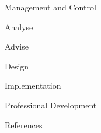 \documentclass{matthijs}
\begin{document}
	\begin{hoofdstuk}{Management and Control}

	\end{hoofdstuk}
	
	\begin{hoofdstuk}{Analyse}

	\end{hoofdstuk}
	
	\begin{hoofdstuk}{Advise}

	\end{hoofdstuk}
	
	\begin{hoofdstuk}{Design}

	\end{hoofdstuk}
	
	\begin{hoofdstuk}{Implementation}

	\end{hoofdstuk}
	
	\begin{hoofdstuk}{Professional Development}

	\end{hoofdstuk}

	\begin{hoofdstuk}{References}

		\printbibliography[heading=none]

	\end{hoofdstuk}

	\makelastpage
\end{document}
